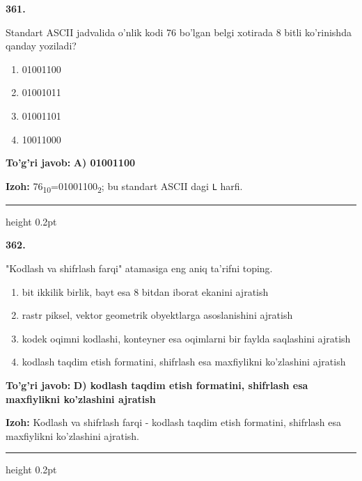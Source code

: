 \documentclass[10pt,a4paper,oneside]{article}
\begin{document}
\noindent\textbf{\color{ink}361.}
\par
Standart ASCII jadvalida o'nlik kodi 76 bo'lgan belgi xotirada 8 bitli ko'rinishda qanday yoziladi?
\begin{enumerate}[label=\Alph*),leftmargin=9mm]
\item 01001100
\item 01001011
\item 01001101
\item 10011000
\end{enumerate}
\begin{tcolorbox}[enhanced,breakable,colback=teal!4,colframe=teal!50!black,boxrule=0.5pt,arc=1.1mm,left=3mm,right=3mm,top=1.7mm,bottom=1.7mm,before skip=2mm,after skip=2mm]
\textbf{\color{teal}To'g'ri javob:} \textbf{A) 01001100}
\par\smallskip
\textbf{Izoh:} 76\textsubscript{1}\textsubscript{0}=01001100\textsubscript{2}; bu standart ASCII dagi \texttt{L} harfi.
\end{tcolorbox}
\vspace{2mm}\hrule height 0.2pt \vspace{3mm}

\noindent\textbf{\color{ink}362.}
\par
"Kodlash va shifrlash farqi" atamasiga eng aniq ta'rifni toping.
\begin{enumerate}[label=\Alph*),leftmargin=9mm]
\item bit ikkilik birlik, bayt esa 8 bitdan iborat ekanini ajratish
\item rastr piksel, vektor geometrik obyektlarga asoslanishini ajratish
\item kodek oqimni kodlashi, konteyner esa oqimlarni bir faylda saqlashini ajratish
\item kodlash taqdim etish formatini, shifrlash esa maxfiylikni ko'zlashini ajratish
\end{enumerate}
\begin{tcolorbox}[enhanced,breakable,colback=teal!4,colframe=teal!50!black,boxrule=0.5pt,arc=1.1mm,left=3mm,right=3mm,top=1.7mm,bottom=1.7mm,before skip=2mm,after skip=2mm]
\textbf{\color{teal}To'g'ri javob:} \textbf{D) kodlash taqdim etish formatini, shifrlash esa maxfiylikni ko'zlashini ajratish}
\par\smallskip
\textbf{Izoh:} Kodlash va shifrlash farqi - kodlash taqdim etish formatini, shifrlash esa maxfiylikni ko'zlashini ajratish.
\end{tcolorbox}
\vspace{2mm}\hrule height 0.2pt \vspace{3mm}
\end{document}
